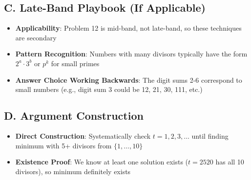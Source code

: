 \documentclass[]{article}
\begin{document}
\begin{strategicbox}
\subsection*{C. Late-Band Playbook (If Applicable)}
\begin{itemize}[leftmargin=*]
    \item \textbf{Applicability}: Problem 12 is mid-band, not late-band, so these techniques are secondary
    \item \textbf{Pattern Recognition}: Numbers with many divisors typically have the form $2^a \cdot 3^b$ or $p^k$ for small primes
    \item \textbf{Answer Choice Working Backwards}: The digit sums 2-6 correspond to small numbers (e.g., digit sum 3 could be 12, 21, 30, 111, etc.)
\end{itemize}

\subsection*{D. Argument Construction}
\begin{itemize}[leftmargin=*]
    \item \textbf{Direct Construction}: Systematically check $t = 1, 2, 3, \ldots$ until finding minimum with 5+ divisors from $\{1,\ldots,10\}$
    \item \textbf{Existence Proof}: We know at least one solution exists ($t = 2520$ has all 10 divisors), so minimum definitely exists
\end{itemize}
\end{strategicbox}
\end{document}
